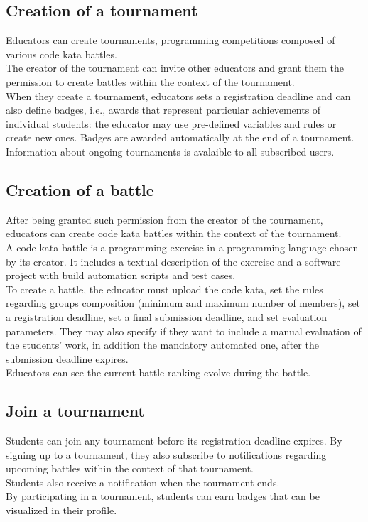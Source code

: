 \subsection{Creation of a tournament}
Educators can create tournaments, programming competitions composed of various code kata battles.\\
The creator of the tournament can invite other educators and grant them the permission to create battles within the 
context of the tournament.\\
When they create a tournament, educators sets a registration deadline and can also define badges, i.e., awards that 
represent particular achievements of individual students: the educator may use pre-defined variables and rules or create 
new ones. Badges are awarded automatically at the end of a tournament.\\
Information about ongoing tournaments is avalaible to all subscribed users.\\

\subsection{Creation of a battle}
After being granted such permission from the creator of the tournament, educators can create code kata battles within the
context of the tournament.\\
A code kata battle is a programming exercise in a programming language chosen by its creator. It includes a textual description
of the exercise and a software project with build automation scripts and test cases.\\
To create a battle, the educator must upload the code kata, set the rules regarding groups composition (minimum and maximum 
number of members), set a registration deadline, set a final submission deadline, and set evaluation parameters. They may also 
specify if they want to include a manual evaluation of the students' work, in addition the mandatory automated one, after the 
submission deadline expires.\\
Educators can see the current battle ranking evolve during the battle.\\

\subsection{Join a tournament}
Students can join any tournament before its registration deadline expires. By signing up to a tournament, they also 
subscribe to notifications regarding upcoming battles within the context of that tournament.\\
Students also receive a notification when the tournament ends.\\
By participating in a tournament, students can earn badges that can be visualized in their profile.\\

